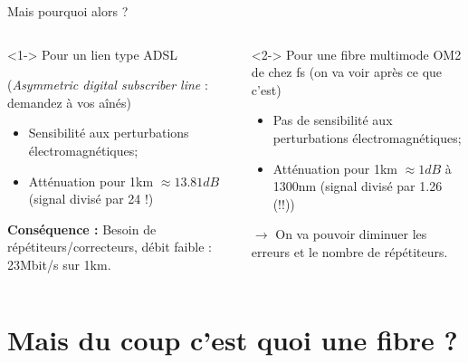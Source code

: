 \documentclass[aspectratio=149, 10pt, t]{beamer}
\begin{document}
\begin{frame}{Mais pourquoi alors ?}
    \begin{columns}
    \begin{column}{0.5\linewidth}<1->
        \medskip
        \alert{Pour un lien type ADSL}
        
        {\footnotesize(\textit{Asymmetric digital subscriber line} : demandez à vos aînés)}
        \medskip
        \begin{itemize}
            \item Sensibilité aux perturbations électromagnétiques;
            \item Atténuation pour 1km $\approx 13.81dB$ (signal divisé par 24 !)
        \end{itemize}
        \medskip
        \textbf{Conséquence :} Besoin de répétiteurs/correcteurs, débit faible : 23Mbit/s sur 1km.
    \end{column}
    \begin{column}{0.5\linewidth}<2->
        \medskip
        \alert{Pour une fibre multimode OM2 de chez fs}
        {\footnotesize (on va voir après ce que c'est)}
        \medskip
        \begin{itemize}
            \item Pas de sensibilité aux perturbations électromagnétiques;
            \item Atténuation pour 1km $\approx 1dB$ à 1300nm (signal divisé par 1.26 (!!))
        \end{itemize}
        $\longrightarrow$ On va pouvoir diminuer les erreurs et le nombre de répétiteurs.
    \end{column}
    \end{columns}
\end{frame}

\section{Mais du coup c'est quoi une fibre ?}
\end{document}
